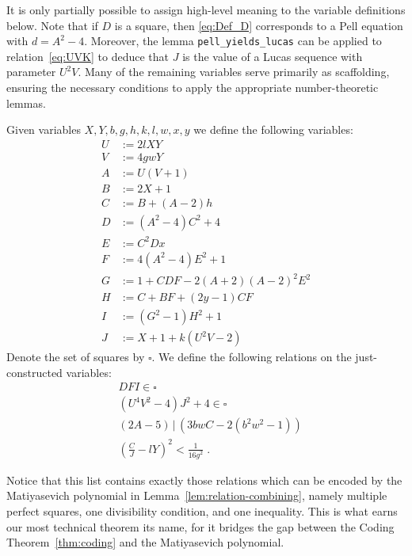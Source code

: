 \documentclass[a4paper,USenglish,cleveref,autoref,thm-restate]{lipics-v2021}
\begin{document}
It is only partially possible to assign high-level meaning to the variable definitions below. Note that if $D$ is a square, then \cref{eq:Def_D} corresponds to a Pell equation with $d = A^2 - 4$. Moreover, the lemma \texttt{pell\_yields\_lucas} can be applied to relation~\eqref{eq:UVK} to deduce that $J$ is the value of a Lucas sequence with parameter $U^2V$. Many of the remaining variables serve primarily as scaffolding, ensuring the necessary conditions to apply the appropriate number-theoretic lemmas.

\begin{definition}
\label{def:VariableDefinition}
Given variables $X,Y,b,g,h,k,l,w,x,y$ we define the following variables:
\begin{subequations}\label{eqs:VariableDefinition}
\begin{align}
U &:= 2lXY \label{eq:Def_U} \\
V &:= 4gwY \label{eq:Def_V} \\
A &:= U(V+1) \label{eq:Def_A} \\
B &:= 2X+1 \label{eq:Def_B} \\
C &:= B+(A-2)h \label{eq:Def_C} \\
D &:= (A^2-4)C^2+4 \label{eq:Def_D} \\
E &:= C^2Dx \label{eq:Def_E} \\
F &:= 4(A^2-4)E^2+1 \label{eq:Def_F} \\
G &:= 1+CDF-2(A+2)(A-2)^2E^2 \label{eq:Def_G} \\
H &:= C+BF+(2y-1)CF \label{eq:Def_H} \\
I &:= (G^2-1)H^2+1 \label{eq:Def_I} \\
J &:= X+1+k(U^2V-2) \label{eq:Def_J}
\end{align}
\end{subequations}
Denote the set of squares by $\square$. We define the following relations on the just-constructed variables:
\begin{subequations}\label{eqs:thm2-properties}
\begin{align}
&DFI \in \square \label{eq:DFI} \\
&(U^{4}V^2-4)J^2+4\in\square \label{eq:UVK} \\
&(2A-5) \,\big|\, (3bwC-2(b^2w^2-1)) \label{eq:pAppWW_new}\\
& \left(\frac{C}{J}-lY\right)^2 < \frac{1}{16g^2} \label{eq:g}
\;.
\end{align}
\end{subequations}
\end{definition}
Notice that this list contains exactly those relations which can be encoded by the Matiyasevich polynomial in Lemma~\ref{lem:relation-combining}, namely multiple perfect squares, one divisibility condition, and one inequality. This is what earns our most technical theorem its name, for it bridges the gap between the Coding Theorem~\ref{thm:coding} and the Matiyasevich polynomial.
\end{document}
